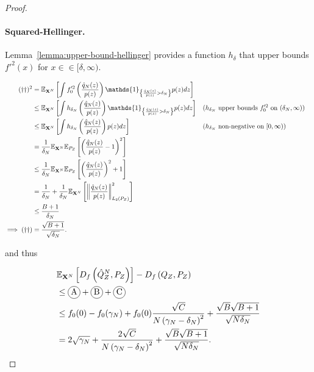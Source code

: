 \begin{proof}
\paragraph{Squared-Hellinger.}
Lemma~\ref{lemma:upper-bound-hellinger} provides a function $h_\delta$ that upper bounds $f'^2(x)$ for $x \in \in[\delta, \infty)$.

\begin{align*}
    (\dagger\dagger)^2 
    &= \E_{\XN} \left[\int f_0'^2\left(\frac{\hat{q}_N(z)}{p(z)} \right) \mathds{1}_{\left\lbrace \frac{\hat{q}_N(z)}{p(z)} > \delta_N \right\rbrace} p(z) dz \right]
    \\
    &\leq \E_{\XN} \left[\int h_{\delta_N}\left(\frac{\hat{q}_N(z)}{p(z)} \right) \mathds{1}_{\left\lbrace \frac{\hat{q}_N(z)}{p(z)} > \delta_N \right\rbrace} p(z) dz \right]
    && \text{($h_{\delta_N}$ upper bounds $f_0'^2$ on $(\delta_N, \infty)$)}
    \\
    &\leq \E_{\XN} \left[\int h_{\delta_N}\left(\frac{\hat{q}_N(z)}{p(z)} \right) p(z) dz \right]
    && \text{($h_{\delta_N}$ non-negative on $[0, \infty)$)}
    \\
    &= \frac{1}{\delta_N} \E_{\XN}\E_{P_Z} \left[ \left(\frac{\hat{q}_N(z)}{p(z)} - 1 \right)^2 \right] \\
    &\leq \frac{1}{\delta_N} \E_{\XN}\E_{P_Z} \left[ \left(\frac{\hat{q}_N(z)}{p(z)}\right)^2 + 1 \right] \\
    &= \frac{1}{\delta_N} + \frac{1}{\delta_N} \E_{\XN}\left[ \left\| \frac{\hat{q}_N(z)}{p(z)}\right\|^2_{L_2(P_Z)} \right]\\
    &\leq \frac{B + 1}{\delta_N} \\
    \implies (\dagger\dagger)&= \frac{\sqrt{B + 1}}{\sqrt{\delta_N}}.
\end{align*}

and thus

\begin{align*}
    &\E_{\XN} \left[ D_f\left( \hat{Q}_Z^N , P_Z\right)\right] - D_f\left( Q_{Z} , P_Z\right)\\
    &\leq \encircle{A} + \encircle{B} + \encircle{C} \\
    &\leq f_0(0) - f_0(\gamma_N) + f_0(0) \frac{\sqrt{C}}{N \left( \gamma_N - \delta_N \right)^2} + \frac{\sqrt{B}\sqrt{B + 1}}{\sqrt{N \delta_N}}\\
    &= 2\sqrt{\gamma_N}  + \frac{2\sqrt{C}}{N \left( \gamma_N - \delta_N \right)^2} + \frac{\sqrt{B}\sqrt{B + 1}}{\sqrt{N \delta_N}}.
\end{align*}


\end{proof}
